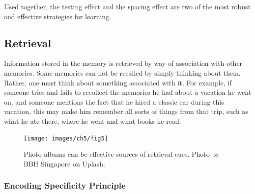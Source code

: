 \documentclass[
]{krantz}
\begin{document}
Used together, the testing effect and the spacing effect are two of the most robust and effective strategies for learning.

\subsection*{Retrieval}\label{retrieval}


Information stored in the memory is retrieved by way of association with other memories. Some memories can not be recalled by simply thinking about them. Rather, one must think about something associated with it. For example, if someone tries and fails to recollect the memories he had about a vacation he went on, and someone mentions the fact that he hired a classic car during this vacation, this may make him remember all sorts of things from that trip, such as what he ate there, where he went and what books he read.

\begin{figure}

{\centering \texttt{[image: images/ch5/fig5]} 

}

\caption{Photo albums can be effective sources of retrieval cues. Photo by BBH Singapore on Uplash.}\label{fig:albumbs}
\end{figure}

\subsubsection*{Encoding Specificity Principle}\label{encoding-specificity-principle}
\end{document}
